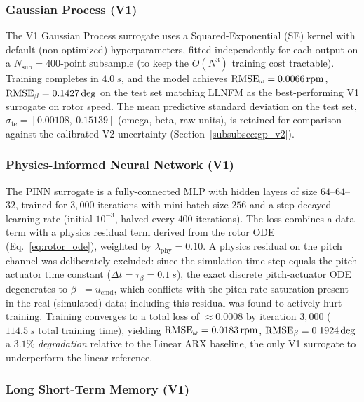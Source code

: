 \subsubsection{Gaussian Process (V1)}
\label{subsubsec:gp_v1}

The V1 Gaussian Process surrogate uses a Squared-Exponential (SE) kernel
with default (non-optimized) hyperparameters, fitted independently for each
output on a $N_{\text{sub}}=400$-point subsample (to keep the $O(N^3)$
training cost tractable). Training completes in $\SI{4.0}{s}$, and the
model achieves $\text{RMSE}_{\omega} = \SI{0.0066}{rpm}$, $\text{RMSE}_{\beta} =
0.1427\deg$ on the test set  matching LLNFM as the best-performing V1
surrogate on rotor speed. The mean predictive standard deviation on the
test set, $\sigma_{\text{te}} = [0.00108,\ 0.15139]$ (omega, beta, raw
units), is retained for comparison against the calibrated V2 uncertainty
(Section~\ref{subsubsec:gp_v2}).

\subsubsection{Physics-Informed Neural Network (V1)}
\label{subsubsec:pinn_v1}

The PINN surrogate is a fully-connected MLP with hidden layers of size
$64$--$64$--$32$, trained for $3{,}000$ iterations with mini-batch size
$256$ and a step-decayed learning rate (initial $10^{-3}$, halved every
$400$ iterations). The loss combines a data term with a physics residual
term derived from the rotor ODE (Eq.~\eqref{eq:rotor_ode}), weighted by
$\lambda_{\text{phy}} = 0.10$. A physics residual on the pitch channel was
deliberately excluded: since the simulation time step equals the pitch
actuator time constant ($\Delta t = \tau_\beta = \SI{0.1}{s}$), the exact
discrete pitch-actuator ODE degenerates to $\beta^{+} = u_{\text{cmd}}$,
which conflicts with the pitch-rate saturation present in the real
(simulated) data; including this residual was found to actively hurt
training. Training converges to a total loss of $\approx 0.0008$ by
iteration $3{,}000$ ($\SI{114.5}{s}$ total training time), yielding
$\text{RMSE}_{\omega} = \SI{0.0183}{rpm}$, $\text{RMSE}_{\beta} = 0.1924\deg$  a
$3.1\%$ \emph{degradation} relative to the Linear ARX baseline, the only V1
surrogate to underperform the linear reference.

\subsubsection{Long Short-Term Memory (V1)}
\label{subsubsec:lstm_v1}

